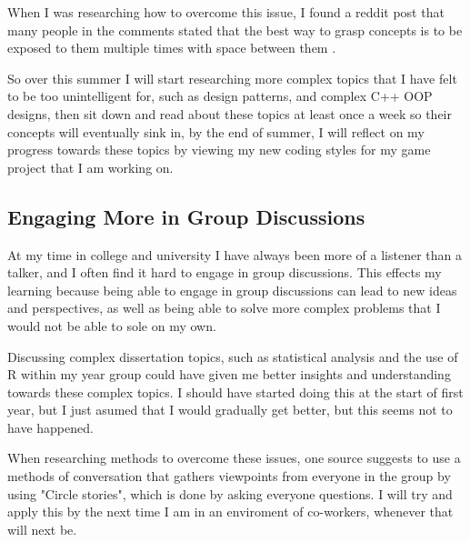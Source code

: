 \documentclass{scrartcl}
\begin{document}
When I was researching how to overcome this issue, I found a reddit post that many people in the comments stated that the best way to grasp concepts is to be exposed to them multiple times with space between them \cite{Reddit}.

So over this summer I will start researching more complex topics that I have felt to be too unintelligent for, such as design patterns, and complex C++ OOP designs, then sit down and read about these topics at least once a week so their concepts will eventually sink in, by the end of summer, I will reflect on my progress towards these topics by viewing my new coding styles for my game project that I am working on.



\subsection{Engaging More  in Group Discussions}

At my time in college and university I have always been more of a listener than a talker, and I often find it hard to engage in group discussions. This effects my learning because being able to engage in group discussions can lead to new ideas and perspectives, as well as being able to solve more complex problems that I would not be able to sole on my own.

Discussing complex dissertation topics, such as statistical analysis and the use of R within my year group could have given me better insights and understanding towards these complex topics. I should have started doing this at the start of first year, but I just asumed that I would gradually get better, but this seems not to have happened.
\par



When researching methods to overcome these issues, one source \cite{Group} suggests to use a methods of conversation that gathers viewpoints from everyone in the group by using "Circle stories", which is done by asking everyone questions. I will try and apply this by the next time I am in an enviroment of co-workers, whenever that will next be.
\end{document}
